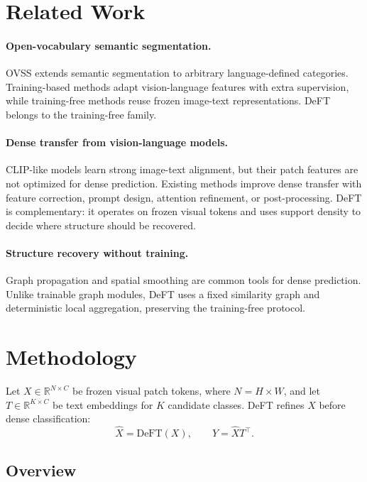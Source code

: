 \documentclass[letterpaper]{article}
\begin{document}
\section{Related Work}

\paragraph{Open-vocabulary semantic segmentation.}
OVSS extends semantic segmentation to arbitrary language-defined categories.
Training-based methods adapt vision-language features with extra supervision,
while training-free methods reuse frozen image-text representations. DeFT
belongs to the training-free family.

\paragraph{Dense transfer from vision-language models.}
CLIP-like models learn strong image-text alignment, but their patch features
are not optimized for dense prediction. Existing methods improve dense
transfer with feature correction, prompt design, attention refinement, or
post-processing. DeFT is complementary: it operates on frozen visual tokens and
uses support density to decide where structure should be recovered.

\paragraph{Structure recovery without training.}
Graph propagation and spatial smoothing are common tools for dense prediction.
Unlike trainable graph modules, DeFT uses a fixed similarity graph and
deterministic local aggregation, preserving the training-free protocol.

\section{Methodology}

Let $X \in \mathbb{R}^{N \times C}$ be frozen visual patch tokens, where
$N=H \times W$, and let $T \in \mathbb{R}^{K \times C}$ be text embeddings for
$K$ candidate classes. DeFT refines $X$ before dense classification:
\begin{equation}
    \hat{X} = \mathrm{DeFT}(X), \qquad
    Y = \hat{X}T^\top .
\end{equation}

\subsection{Overview}
\end{document}
